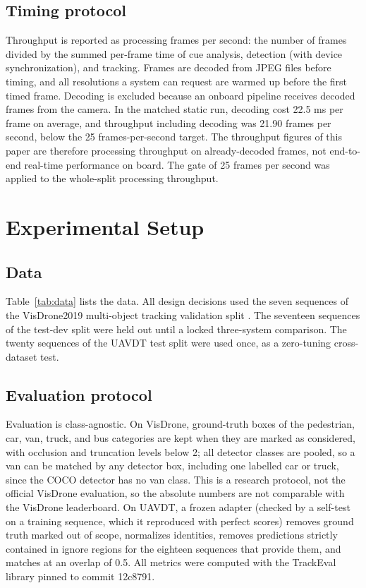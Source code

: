 \documentclass[journal]{new-aiaa}
\begin{document}
\subsection{Timing protocol}
Throughput is reported as processing frames per second: the number of frames divided by the summed per-frame time of cue analysis, detection (with device synchronization), and tracking. Frames are decoded from JPEG files before timing, and all resolutions a system can request are warmed up before the first timed frame. Decoding is excluded because an onboard pipeline receives decoded frames from the camera. In the matched static run, decoding cost 22.5 ms per frame on average, and throughput including decoding was 21.90 frames per second, below the 25 frames-per-second target. The throughput figures of this paper are therefore processing throughput on already-decoded frames, not end-to-end real-time performance on board. The gate of 25 frames per second was applied to the whole-split processing throughput.

\section{Experimental Setup}\label{sec:setup}

\subsection{Data}
Table~\ref{tab:data} lists the data. All design decisions used the seven sequences of the VisDrone2019 multi-object tracking validation split \cite{zhu2022visdrone}. The seventeen sequences of the test-dev split were held out until a locked three-system comparison. The twenty sequences of the UAVDT test split \cite{du2018uavdt} were used once, as a zero-tuning cross-dataset test.



\subsection{Evaluation protocol}
Evaluation is class-agnostic. On VisDrone, ground-truth boxes of the pedestrian, car, van, truck, and bus categories are kept when they are marked as considered, with occlusion and truncation levels below 2; all detector classes are pooled, so a van can be matched by any detector box, including one labelled car or truck, since the COCO detector has no van class. This is a research protocol, not the official VisDrone evaluation, so the absolute numbers are not comparable with the VisDrone leaderboard. On UAVDT, a frozen adapter (checked by a self-test on a training sequence, which it reproduced with perfect scores) removes ground truth marked out of scope, normalizes identities, removes predictions strictly contained in ignore regions for the eighteen sequences that provide them, and matches at an overlap of 0.5. All metrics were computed with the TrackEval library pinned to commit 12c8791.
\end{document}
